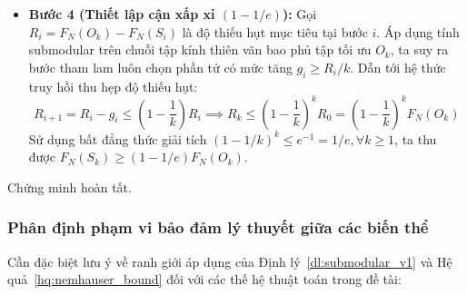 \begin{cm}
\begin{itemize}
    \item \textbf{Bước 4 (Thiết lập cận xấp xỉ $(1 - 1/e)$):}
    Gọi $R_i = F_N(O_k) - F_N(S_i)$ là độ thiếu hụt mục tiêu tại bước $i$. Áp dụng tính submodular trên chuỗi tập kính thiên văn bao phủ tập tối ưu $O_k$, ta suy ra bước tham lam luôn chọn phần tử có mức tăng $g_i \ge R_i / k$. Dẫn tới hệ thức truy hồi thu hẹp độ thiếu hụt:
    \begin{equation}
    R_{i+1} = R_i - g_i \le \left(1 - \frac{1}{k}\right) R_i \implies R_k \le \left(1 - \frac{1}{k}\right)^k R_0 = \left(1 - \frac{1}{k}\right)^k F_N(O_k)
    \end{equation}
    Sử dụng bất đẳng thức giải tích $(1 - 1/k)^k \le e^{-1} = 1/e, \forall k \ge 1$, ta thu được $F_N(S_k) \ge (1 - 1/e) F_N(O_k)$.
\end{itemize}
Chứng minh hoàn tất.
\end{cm}

\subsubsection{Phân định phạm vi bảo đảm lý thuyết giữa các biến thể}
\label{subsubsec:guarantee_scope}

Cần đặc biệt lưu ý về ranh giới áp dụng của Định lý~\ref{dl:submodular_v1} và Hệ quả~\ref{hq:nemhauser_bound} đối với các thế hệ thuật toán trong đề tài:

